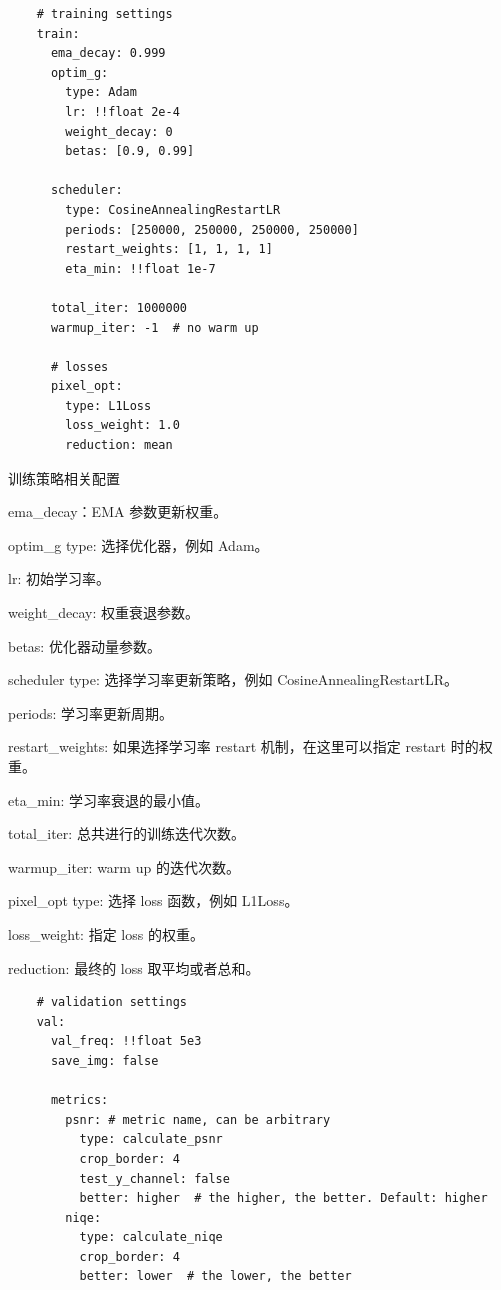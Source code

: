 \documentclass[../main.tex]{subfiles}
\begin{document}
    \begin{verbatim}
    # training settings
    train:
      ema_decay: 0.999
      optim_g:
        type: Adam
        lr: !!float 2e-4
        weight_decay: 0
        betas: [0.9, 0.99]

      scheduler:
        type: CosineAnnealingRestartLR
        periods: [250000, 250000, 250000, 250000]
        restart_weights: [1, 1, 1, 1]
        eta_min: !!float 1e-7

      total_iter: 1000000
      warmup_iter: -1  # no warm up

      # losses
      pixel_opt:
        type: L1Loss
        loss_weight: 1.0
        reduction: mean
    \end{verbatim}
    \begin{exampleBox}[righthand ratio=0.00, sidebyside, sidebyside align=center, lower separated=false]{训练策略相关配置}

    ema\_decay：EMA 参数更新权重。

    optim\_g type: 选择优化器，例如 Adam。

    lr: 初始学习率。

    weight\_decay: 权重衰退参数。

    betas: 优化器动量参数。

    scheduler type: 选择学习率更新策略，例如 CosineAnnealingRestartLR。

    periods: 学习率更新周期。

    restart\_weights: 如果选择学习率 restart 机制，在这里可以指定 restart 时的权重。

    eta\_min: 学习率衰退的最小值。

    total\_iter: 总共进行的训练迭代次数。

    warmup\_iter: warm up 的迭代次数。

    pixel\_opt type: 选择 loss 函数，例如 L1Loss。

    loss\_weight: 指定 loss 的权重。

    reduction: 最终的 loss 取平均或者总和。

    \end{exampleBox}
    \begin{verbatim}
    # validation settings
    val:
      val_freq: !!float 5e3
      save_img: false

      metrics:
        psnr: # metric name, can be arbitrary
          type: calculate_psnr
          crop_border: 4
          test_y_channel: false
          better: higher  # the higher, the better. Default: higher
        niqe:
          type: calculate_niqe
          crop_border: 4
          better: lower  # the lower, the better
    \end{verbatim}
\end{document}
